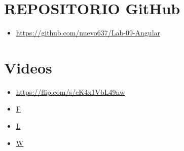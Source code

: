 \documentclass{article}
\begin{document}
	\clearpage




	\section{REPOSITORIO GitHub}

	\begin{itemize}
		\item \url{https://github.com/nuevo637/Lab-09-Angular}
	\end{itemize}
	
	\section{Videos}
	\begin{itemize}
		\item \url{https://flip.com/s/cK4x1VbL49nw}
		\item \url{F}
		\item \url{L}
		\item \url{W}
	\end{itemize}
\end{document}
